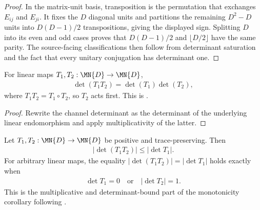 \begin{proof}\leanok
    In the matrix-unit basis, transposition is the permutation that exchanges
    $E_{ij}$ and $E_{ji}$.  It fixes the $D$ diagonal units and partitions the
    remaining $D^2-D$ units into $D(D-1)/2$ transpositions, giving the displayed
    sign.  Splitting $D$ into its even and odd cases proves that
    $D(D-1)/2$ and $\lfloor D/2\rfloor$ have the same parity.  The source-facing
    classifications then follow from determinant saturation and the fact that
    every unitary conjugation has determinant one.
\end{proof}

\begin{theorem}
    \label{thm:channelDet_comp}
    \leanok
    For linear maps $T_1,T_2:\MN{D}\to\MN{D}$,
    \begin{align}
        \det(T_1T_2)=\det(T_1)\det(T_2),
    \end{align}
    where $T_1T_2=T_1\circ T_2$, so $T_2$ acts first.  This is
    \cite[Equation~(6.22)]{Wolf2012Quantum}.
\end{theorem}

\begin{proof}\leanok
    Rewrite the channel determinant as the determinant of the underlying
    linear endomorphism and apply multiplicativity of the latter.
\end{proof}

\begin{theorem}
    \label{thm:channelDet_comp_monotone_algebraic}
    \leanok
    Let $T_1,T_2:\MN{D}\to\MN{D}$ be positive and trace-preserving.  Then
    \begin{align}
        |\det(T_1T_2)|\leq |\det T_1|.
    \end{align}
    For arbitrary linear maps, the equality
    $|\det(T_1T_2)|=|\det T_1|$ holds exactly when
    \begin{align}
        \det T_1=0 \quad\text{or}\quad |\det T_2|=1.
    \end{align}
    This is the multiplicative and determinant-bound part of the
    monotonicity corollary following
    \cite[Theorem~6.1]{Wolf2012Quantum}.
\end{theorem}

